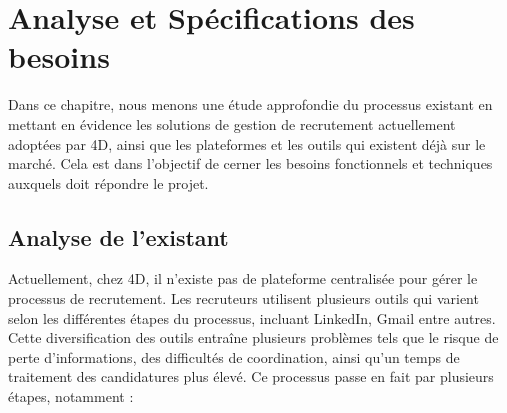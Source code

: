 

\chapter{Analyse et Spécifications des besoins}
\pagestyle{chapterstyle}
Dans ce chapitre, nous menons une étude approfondie du processus existant en mettant
en évidence les solutions de gestion de recrutement actuellement adoptées par 4D, ainsi
que les plateformes et les outils qui existent déjà sur le marché. Cela est dans l’objectif
de cerner les besoins fonctionnels et techniques auxquels doit répondre le projet.

\newpage
\vspace{1cm}


\section{Analyse de l'existant}
Actuellement, chez 4D, il n’existe pas de plateforme centralisée pour gérer le processus
de recrutement. Les recruteurs utilisent plusieurs outils qui varient selon les différentes
étapes du processus, incluant LinkedIn, Gmail entre autres. Cette diversification des outils
entraîne plusieurs problèmes tels que le risque de perte d’informations, des difficultés de
coordination, ainsi qu’un temps de traitement des candidatures plus élevé. Ce processus
passe en fait par plusieurs étapes, notamment :

